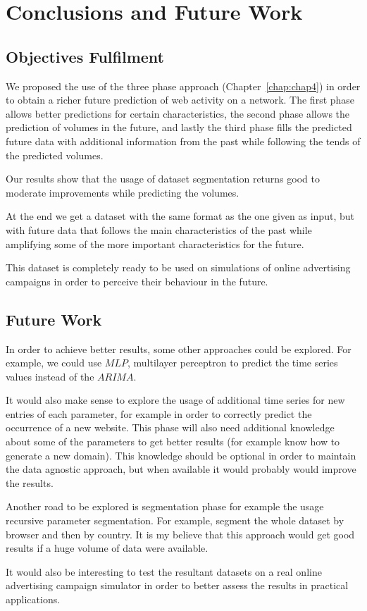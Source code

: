 \chapter{Conclusions and Future Work} \label{chap:concl}

\section*{}

\section{Objectives Fulfilment}

We proposed the use of the three phase approach (Chapter~\ref{chap:chap4}) in
order to obtain a richer future prediction of web activity on a network.
The first phase allows better predictions for certain characteristics,
the second phase allows the prediction of volumes in the future, and lastly the third
phase fills the predicted future data with additional information from the past
while following
the tends of the predicted volumes.

Our results show that the usage of dataset segmentation returns good to moderate
improvements while predicting the volumes.

At the end we get a dataset with the same format as the one given as input, but with future
data that follows the main characteristics of the past while amplifying some of the
more important characteristics for the future.

This dataset is completely ready to be used on simulations of online advertising
campaigns in order to perceive their behaviour in the future.

\section{Future Work}

In order to achieve better results, some other approaches could be explored. For
example, we could use $MLP$, multilayer perceptron to predict the time series values
instead of the $ARIMA$.

It would also make sense to explore the usage of additional time series for new
entries of each parameter, for example in order to correctly predict the occurrence of a new
website. This phase will also need additional knowledge about
some of the parameters to get better results (for example know how to generate a
new domain). This knowledge should be optional in order to maintain the data
agnostic approach, but when available it would probably would improve the results.

Another road to be explored is segmentation phase for example the usage
recursive parameter segmentation. For example, segment the whole dataset by
browser and then by country. It is my believe that this approach would get good
results if a huge volume of data were available.

It would also be interesting to test the resultant datasets on a real online
advertising campaign simulator in order to better assess the results in practical
applications.


